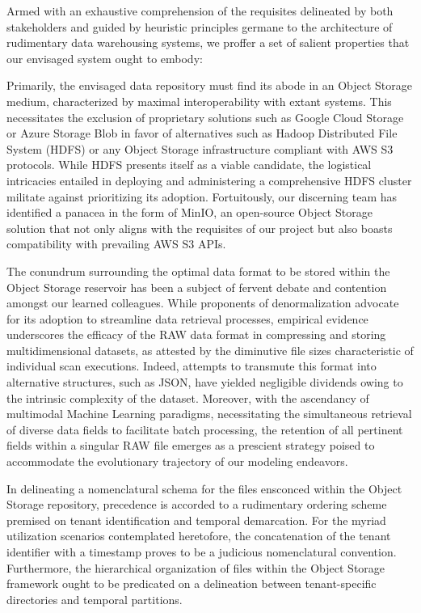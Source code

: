 Armed with an exhaustive comprehension of the requisites delineated by both
stakeholders and guided by heuristic principles germane to the architecture of
rudimentary data warehousing systems, we proffer a set of salient properties
that our envisaged system ought to embody:

Primarily, the envisaged data repository must find its abode in an Object
Storage medium, characterized by maximal interoperability with extant systems.
This necessitates the exclusion of proprietary solutions such as Google Cloud
Storage or Azure Storage Blob in favor of alternatives such as Hadoop
Distributed File System (HDFS) \cite{HDFS} or any Object Storage infrastructure compliant
with AWS S3 protocols. While HDFS presents itself as a viable candidate, the
logistical intricacies entailed in deploying and administering a comprehensive
HDFS cluster militate against prioritizing its adoption. Fortuitously, our
discerning team has identified a panacea in the form of MinIO, an open-source
Object Storage solution that not only aligns with the requisites of our project
but also boasts compatibility with prevailing AWS S3 APIs.

The conundrum surrounding the optimal data format to be stored within the Object
Storage reservoir has been a subject of fervent debate and contention amongst
our learned colleagues. While proponents of denormalization advocate for its
adoption to streamline data retrieval processes, empirical evidence underscores
the efficacy of the RAW data format in compressing and storing multidimensional
datasets, as attested by the diminutive file sizes characteristic of individual
scan executions. Indeed, attempts to transmute this format into alternative
structures, such as JSON, have yielded negligible dividends owing to the
intrinsic complexity of the dataset. Moreover, with the ascendancy of multimodal
Machine Learning paradigms, necessitating the simultaneous retrieval of diverse
data fields to facilitate batch processing, the retention of all pertinent
fields within a singular RAW file emerges as a prescient strategy poised to
accommodate the evolutionary trajectory of our modeling endeavors.

In delineating a nomenclatural schema for the files ensconced within the Object
Storage repository, precedence is accorded to a rudimentary ordering scheme
premised on tenant identification and temporal demarcation. For the myriad
utilization scenarios contemplated heretofore, the concatenation of the tenant
identifier with a timestamp proves to be a judicious nomenclatural convention.
Furthermore, the hierarchical organization of files within the Object Storage
framework ought to be predicated on a delineation between tenant-specific
directories and temporal partitions.

